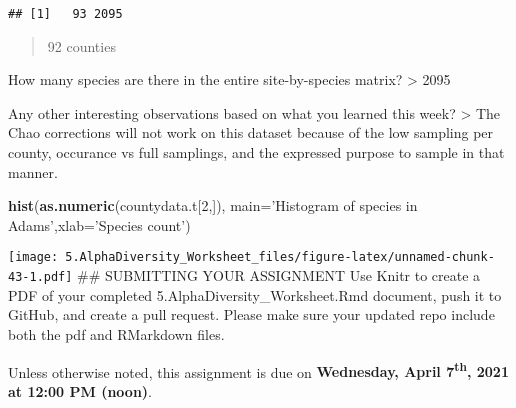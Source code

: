 \documentclass[
]{article}
\newenvironment{Shaded}{\begin{snugshade}}{\end{snugshade}}
\newcommand{\DataTypeTok}[1]{\textcolor[rgb]{0.13,0.29,0.53}{#1}}
\newcommand{\DecValTok}[1]{\textcolor[rgb]{0.00,0.00,0.81}{#1}}
\newcommand{\KeywordTok}[1]{\textcolor[rgb]{0.13,0.29,0.53}{\textbf{#1}}}
\newcommand{\NormalTok}[1]{#1}
\newcommand{\StringTok}[1]{\textcolor[rgb]{0.31,0.60,0.02}{#1}}
\begin{document}
\begin{verbatim}
## [1]   93 2095
\end{verbatim}

\begin{quote}
92 counties
\end{quote}

How many species are there in the entire site-by-species matrix?
\textgreater{} 2095

Any other interesting observations based on what you learned this week?
\textgreater{} The Chao corrections will not work on this dataset
because of the low sampling per county, occurance vs full samplings, and
the expressed purpose to sample in that manner.

\begin{Shaded}
\begin{Highlighting}[]
\KeywordTok{hist}\NormalTok{(}\KeywordTok{as.numeric}\NormalTok{(countydata.t[}\DecValTok{2}\NormalTok{,]), }\DataTypeTok{main=}\StringTok{'Histogram of species in Adams'}\NormalTok{,}\DataTypeTok{xlab=}\StringTok{'Species count'}\NormalTok{)}
\end{Highlighting}
\end{Shaded}

\texttt{[image: 5.AlphaDiversity\_Worksheet\_files/figure-latex/unnamed-chunk-43-1.pdf]}
\#\# SUBMITTING YOUR ASSIGNMENT Use Knitr to create a PDF of your
completed 5.AlphaDiversity\_Worksheet.Rmd document, push it to GitHub,
and create a pull request. Please make sure your updated repo include
both the pdf and RMarkdown files.

Unless otherwise noted, this assignment is due on \textbf{Wednesday,
April 7\textsuperscript{th}, 2021 at 12:00 PM (noon)}.
\end{document}
